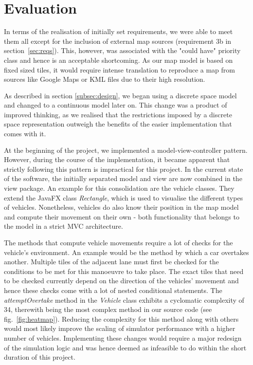 \section{Evaluation}
\label{ss:eval_sim}
In terms of the realisation of initially set requirements, we were able to meet them all except for the inclusion of external map sources (requirement 3b in section~\ref{sec:reqs}). This, however, was associated with the "could have" priority class and hence is an acceptable shortcoming. As our map model is based on fixed sized tiles, it would require intense translation to reproduce a map from sources like Google Maps or KML files due to their high resolution. 

As described in section \ref{subsec:design}, we began using a discrete space model and changed to a continuous model later on. This change was a product of improved thinking, as we realised that the restrictions imposed by a discrete space representation outweigh the benefits of the easier implementation that comes with it.

At the beginning of the project, we implemented a model-view-controller pattern. However, during the course of the implementation, it became apparent that strictly following this pattern is impractical for this project. In the current state of the software, the initially separated model and view are now combined in the view package. An example for this consolidation are the vehicle classes. They extend the JavaFX class \textit{Rectangle}, which is used to visualise the different types of vehicles. Nonetheless, vehicles do also know their position in the map model and compute their movement on their own - both functionality that belongs to the model in a strict MVC architecture.

The methods that compute vehicle movements require a lot of checks for the vehicle's environment. An example would be the method by which a car overtakes another. Multiple tiles of the adjacent lane must first be checked for the conditions to be met for this manoeuvre to take place. The exact tiles that need to be checked currently depend on the direction of the vehicles' movement and hence these checks come with a lot of nested conditional statements. The \textit{attemptOvertake} method in the \textit{Vehicle} class exhibits a cyclomatic complexity of 34, therewith being the most complex method in our source code (see fig.~\ref{fig:heatmap}). Reducing the complexity for this method along with others would most likely improve the scaling of simulator performance with a higher number of vehicles. Implementing these changes would require a major redesign of the simulation logic and was hence deemed as infeasible to do within the short duration of this project.

